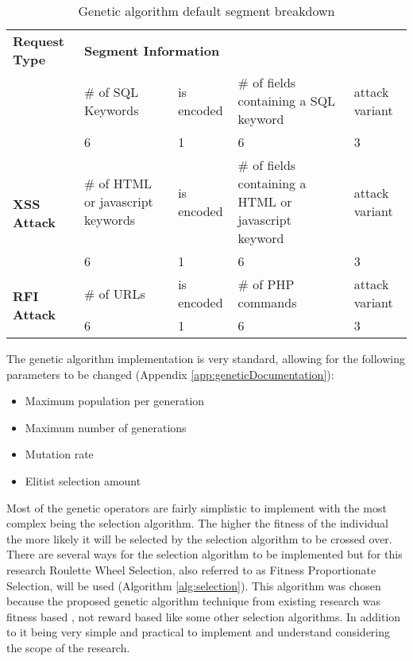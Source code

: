 \begin{table}
	\begin{tabular}{|p{1.25in}|p{1in}|p{1in}|p{1in}|p{1in}|}
	\hline
	\multicolumn{1}{|p{1.25in}|}{\textbf{Request Type}} & \multicolumn{4}{p{4in}|}{\textbf{Segment Information}} \\ \hhline{|=|=|=|=|=|}
	\multirow{2}{*}{\textbf{SQL Injection}}            & \# of SQL Keywords & is encoded & \# of fields containing a SQL keyword & attack variant \\ \cline{2-5} 
		                                      & 6             & 1          & 6            & 3 \\ \hline  
	\multirow{2}{*}{\textbf{XSS Attack}}               & \# of HTML or javascript keywords & is encoded & \# of fields containing a HTML or javascript keyword & attack variant \\ \cline{2-5} 
		                                      & 6             & 1          & 6            & 3 \\ \hline
	\multirow{2}{*}{\textbf{RFI Attack}}               & \# of URLs & is encoded & \# of PHP commands & attack variant \\ \cline{2-5} 
		                                      & 6             & 1          & 6            & 3 \\ \hline  
	\end{tabular}
	\caption{Genetic algorithm default segment breakdown}
	\label{tab:geneticSegments}
\end{table}

The genetic algorithm implementation is very standard, allowing for the following parameters to be changed (Appendix \ref{app:geneticDocumentation}):

\begin{itemize}
	\item Maximum population per generation
	\item Maximum number of generations
	\item Mutation rate
	\item Elitist selection amount
\end{itemize}

Most of the genetic operators are fairly simplistic to implement with the most complex being the selection algorithm.  The higher the fitness of the individual the more likely it will be selected by the selection algorithm to be crossed over.  There are several ways for the selection algorithm to be implemented but for this research Roulette Wheel Selection, also referred to as Fitness Proportionate Selection, will be used (Algorithm \ref{alg:selection}).  This algorithm was chosen because the proposed genetic algorithm technique from existing research was fitness based \cite{mainPaper}, not reward based like some other selection algorithms.  In addition to it being very simple and practical to implement and understand considering the scope of the research.

